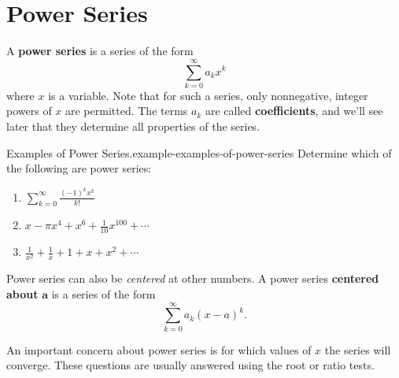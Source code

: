 \documentclass[10pt,]{book}
\newcommand{\terminology}[1]{\textbf{#1}}
\numberwithin{equation}{section}
\begin{document}
\section[{Power Series}]{Power Series}\label{section-power-series}
\hypertarget{p-930}{}%
A \terminology{power series} is a series of the form%
\begin{equation*}
\sum_{k=0}^{\infty}a_{k}x^{k}
\end{equation*}
where \(x\) is a variable. Note that for such a series, only nonnegative, integer powers of \(x\) are permitted. The terms \(a_{k}\) are called \terminology{coefficients}, and we'll see later that they determine all properties of the series.%
\begin{example}{Examples of Power Series.}{example-examples-of-power-series}%
\hypertarget{p-931}{}%
Determine which of the following are power series: \leavevmode%
\begin{enumerate}
\item\hypertarget{li-107}{}\(\sum_{k=0}^{\infty}\frac{(-1)^{k}x^{k}}{k!}\)%
\item\hypertarget{li-108}{}\(x - \pi x^{4} + x^{6} + \frac{1}{10}x^{100} + \cdots\)%
\item\hypertarget{li-109}{}\(\frac{1}{x^{2}} + \frac{1}{x} + 1 + x + x^{2} + \cdots\)%
\end{enumerate}
%
\end{example}
\hypertarget{p-932}{}%
Power series can also be \emph{centered} at other numbers. A power series \terminology{centered about} \(\mathbf{a}\) is a series of the form%
\begin{equation*}
\sum_{k=0}^{\infty}a_{k}(x - a)^{k}\text{.}
\end{equation*}
%
\par
\hypertarget{p-933}{}%
An important concern about power series is for which values of \(x\) the series will converge. These questions are usually answered using the root or ratio tests.%
\end{document}
